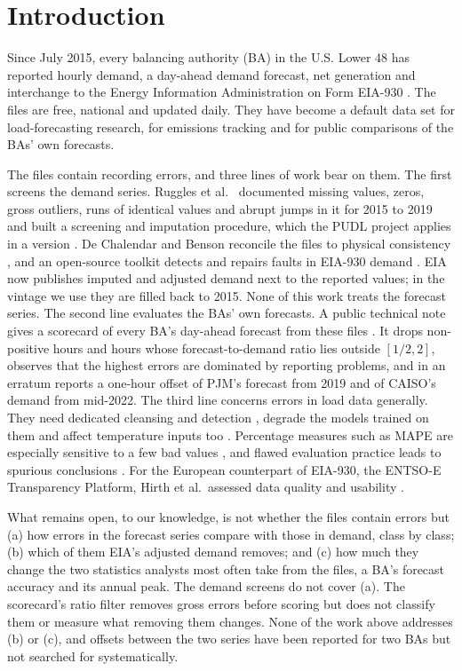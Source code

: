 \documentclass[conference,a4paper]{IEEEtran}
\begin{document}
\section{Introduction}

Since July 2015, every balancing authority (BA) in the U.S. Lower 48 has reported hourly demand, a day-ahead demand forecast, net generation and interchange to the Energy Information Administration on Form EIA-930 \cite{eia930}. The files are free, national and updated daily. They have become a default data set for load-forecasting research, for emissions tracking \cite{dechalendar2019tracking} and for public comparisons of the BAs' own forecasts.

The files contain recording errors, and three lines of work bear on them. The first screens the demand series. Ruggles et al.\ \cite{ruggles2020eia} documented missing values, zeros, gross outliers, runs of identical values and abrupt jumps in it for 2015 to 2019 and built a screening and imputation procedure, which the PUDL project applies in a version \cite{pudl}. De Chalendar and Benson reconcile the files to physical consistency \cite{dechalendar2021reconciliation}, and an open-source toolkit detects and repairs faults in EIA-930 demand \cite{guerrafilho2026sentinel}. EIA now publishes imputed and adjusted demand next to the reported values; in the vintage we use they are filled back to 2015. None of this work treats the forecast series. The second line evaluates the BAs' own forecasts. A public technical note gives a scorecard of every BA's day-ahead forecast from these files \cite{guerrafilho2026scorecard}. It drops non-positive hours and hours whose forecast-to-demand ratio lies outside $[1/2, 2]$, observes that the highest errors are dominated by reporting problems, and in an erratum reports a one-hour offset of PJM's forecast from 2019 and of CAISO's demand from mid-2022. The third line concerns errors in load data generally. They need dedicated cleansing and detection \cite{chen2010cleansing,yue2019descriptive}, degrade the models trained on them \cite{luo2018robustness} and affect temperature inputs too \cite{sobhani2020temperature}. Percentage measures such as MAPE are especially sensitive to a few bad values \cite{hyndman2006another}, and flawed evaluation practice leads to spurious conclusions \cite{hewamalage2023forecast}. For the European counterpart of EIA-930, the ENTSO-E Transparency Platform, Hirth et al.\ assessed data quality and usability \cite{hirth2018entsoe}.

What remains open, to our knowledge, is not whether the files contain errors but (a) how errors in the forecast series compare with those in demand, class by class; (b) which of them EIA's adjusted demand removes; and (c) how much they change the two statistics analysts most often take from the files, a BA's forecast accuracy and its annual peak. The demand screens do not cover (a). The scorecard's ratio filter removes gross errors before scoring but does not classify them or measure what removing them changes. None of the work above addresses (b) or (c), and offsets between the two series have been reported for two BAs but not searched for systematically.
\end{document}
